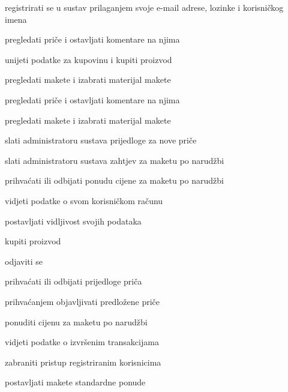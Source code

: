 			
			\begin{packed_enum}
				\item  {}
				
				\begin{packed_enum}
					
					\item registrirati se u sustav prilaganjem svoje e-mail adrese, lozinke i korisničkog imena
					\item pregledati priče i ostavljati komentare na njima
					\item unijeti podatke za kupovinu i kupiti proizvod
					\item pregledati makete i izabrati materijal makete
						
				\end{packed_enum}
					
				
				\item  {}
				
				\begin{packed_enum}
					
					\item pregledati priče i ostavljati komentare na njima
					\item pregledati makete i izabrati materijal makete
					\item slati administratoru sustava prijedloge za nove priče
					\item slati administratoru sustava zahtjev za maketu po narudžbi
					\item prihvaćati ili odbijati ponudu cijene za maketu po narudžbi
					\item vidjeti podatke o svom korisničkom računu
					\item postavljati vidljivost svojih podataka
					\item kupiti proizvod
					\item odjaviti se
					
				\end{packed_enum}
				

			
			\item  {}
			
			\begin{packed_enum}
				
				\item prihvaćati ili odbijati prijedloge priča
				\item prihvaćanjem objavljivati predložene priče
				\item ponuditi cijenu za maketu po narudžbi
				\item vidjeti podatke o izvršenim transakcijama
				\item zabraniti pristup registriranim korisnicima
				\item postavljati makete standardne ponude
				

\end{packed_enum}
\end{packed_enum}
